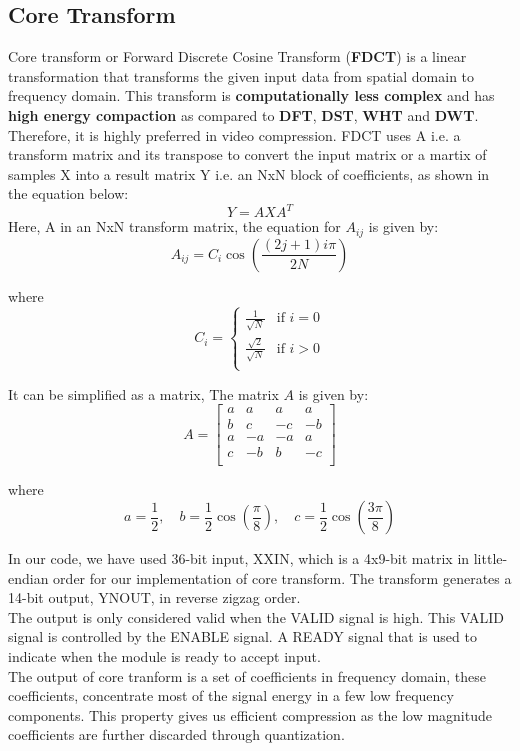 \subsection{Core Transform}
Core transform or Forward Discrete Cosine Transform (\textbf{FDCT}) is a linear transformation that transforms the given input data from spatial domain to frequency domain. This transform is \textbf{computationally less complex} and has \textbf{high energy compaction} as compared to \textbf{DFT}, \textbf{DST}, \textbf{WHT} and \textbf{DWT}. Therefore, it is highly preferred in video compression.
FDCT uses A i.e. a transform matrix and its transpose to convert the input matrix or a martix of samples X into a result matrix Y i.e. an NxN block of coefficients, as shown in the equation below:
\begin{equation}
	Y = AXA^{T}
\end{equation}
Here, A in an NxN transform matrix, the equation for $A_{ij}$ is given by:
\[
A_{ij} = C_i \cos\left(\frac{(2j + 1)i\pi}{2N}\right)
\]

where
\[
C_i = \begin{cases} 
	\frac{1}{\sqrt{N}} & \text{if } i = 0 \\
	\frac{\sqrt{2}}{\sqrt{N}} & \text{if } i > 0 \\
\end{cases}
\]

It can be simplified as a matrix, The matrix $A$ is given by:
\[
A = \begin{bmatrix}
	a & a & a & a \\
	b & c & -c & -b \\
	a & -a & -a & a \\
	c & -b & b & -c \\
\end{bmatrix}
\]

where
\[
a = \frac{1}{2}, \quad
b = \frac{1}{2}\cos\left(\frac{\pi}{8}\right), \quad
c = \frac{1}{2}\cos\left(\frac{3\pi}{8}\right)
\]

In our code, we have used 36-bit input, XXIN, which is a 4x9-bit matrix in little-endian order for our implementation of core transform. The transform generates a 14-bit output, YNOUT, in reverse zigzag order.\\
The output is only considered valid when the VALID signal is high. This VALID signal is controlled by the ENABLE signal. A READY signal that is used to indicate when the module is ready to accept input.\\
The output of core tranform is a set of coefficients in frequency domain, these coefficients, concentrate most of the signal energy in a few low frequency components. This property gives us efficient compression as the low magnitude coefficients are further discarded through quantization.


